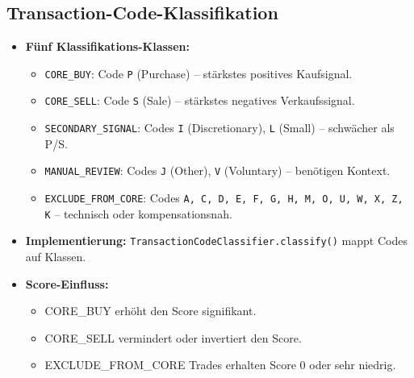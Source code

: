 \subsection{Transaction-Code-Klassifikation}
\begin{itemize}
  \item \textbf{Fünf Klassifikations-Klassen:} %
    \begin{itemize}
      \item \texttt{CORE\_BUY}: Code \texttt{P} (Purchase) -- stärkstes positives Kaufsignal. %
      \item \texttt{CORE\_SELL}: Code \texttt{S} (Sale) -- stärkstes negatives Verkaufssignal. %
      \item \texttt{SECONDARY\_SIGNAL}: Codes \texttt{I} (Discretionary), \texttt{L} (Small) -- schwächer als P/S. %
      \item \texttt{MANUAL\_REVIEW}: Codes \texttt{J} (Other), \texttt{V} (Voluntary) -- benötigen Kontext. %
      \item \texttt{EXCLUDE\_FROM\_CORE}: Codes \texttt{A, C, D, E, F, G, H, M, O, U, W, X, Z, K} -- technisch oder kompensationsnah. %
    \end{itemize}
  \item \textbf{Implementierung:} \texttt{TransactionCodeClassifier.classify()} mappt Codes auf Klassen. %
  \item \textbf{Score-Einfluss:}
    \begin{itemize}
      \item CORE\_BUY erhöht den Score signifikant.
      \item CORE\_SELL vermindert oder invertiert den Score.
      \item EXCLUDE\_FROM\_CORE Trades erhalten Score 0 oder sehr niedrig.
    \end{itemize}
\end{itemize}

